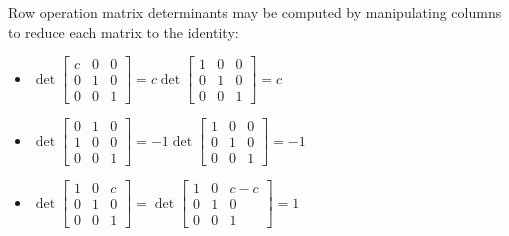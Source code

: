 \begin{applicationActivities}
\begin{fact}
Row operation matrix determinants may be computed by manipulating columns
to reduce each matrix to the identity:
\begin{itemize}
\item \(\det
  \begin{bmatrix}
  c & 0 & 0 \\
  0 & 1 & 0 \\
  0 & 0 & 1
  \end{bmatrix}
    =
  c\det
  \begin{bmatrix}
  1 & 0 & 0 \\
  0 & 1 & 0 \\
  0 & 0 & 1
  \end{bmatrix}
    =
  c
\)
\item \(\det
  \begin{bmatrix}
  0 & 1 & 0 \\
  1 & 0 & 0 \\
  0 & 0 & 1
  \end{bmatrix}
    =
  -1\det
  \begin{bmatrix}
  1 & 0 & 0 \\
  0 & 1 & 0 \\
  0 & 0 & 1
  \end{bmatrix}
    =
  -1
\)
\item \(\det
  \begin{bmatrix}
  1 & 0 & c \\
  0 & 1 & 0 \\
  0 & 0 & 1
  \end{bmatrix}
    =
  \det
  \begin{bmatrix}
  1 & 0 & c-c \\
  0 & 1 & 0 \\
  0 & 0 & 1
  \end{bmatrix}
    =
  1
\)
\end{itemize}
\end{fact}


\end{applicationActivities}
